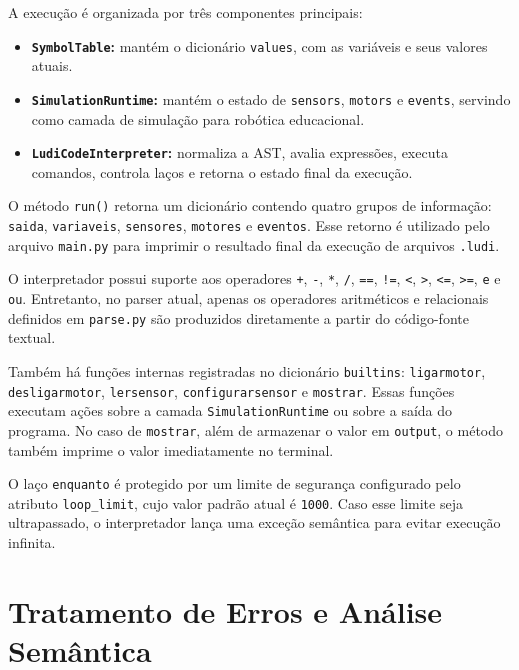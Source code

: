 \documentclass[12pt,a4paper]{article}
\begin{document}
A execução é organizada por três componentes principais:

\begin{itemize}
    \item \textbf{\texttt{SymbolTable}:} mantém o dicionário \texttt{values}, com as variáveis e seus valores atuais.
    \item \textbf{\texttt{SimulationRuntime}:} mantém o estado de \texttt{sensors}, \texttt{motors} e \texttt{events}, servindo como camada de simulação para robótica educacional.
    \item \textbf{\texttt{LudiCodeInterpreter}:} normaliza a AST, avalia expressões, executa comandos, controla laços e retorna o estado final da execução.
\end{itemize}

O método \texttt{run()} retorna um dicionário contendo quatro grupos de informação: \texttt{saida}, \texttt{variaveis}, \texttt{sensores}, \texttt{motores} e \texttt{eventos}. Esse retorno é utilizado pelo arquivo \texttt{main.py} para imprimir o resultado final da execução de arquivos \texttt{.ludi}.

O interpretador possui suporte aos operadores \texttt{+}, \texttt{-}, \texttt{*}, \texttt{/}, \texttt{==}, \texttt{!=}, \texttt{<}, \texttt{>}, \texttt{<=}, \texttt{>=}, \texttt{e} e \texttt{ou}. Entretanto, no parser atual, apenas os operadores aritméticos e relacionais definidos em \texttt{parse.py} são produzidos diretamente a partir do código-fonte textual.

Também há funções internas registradas no dicionário \texttt{builtins}: \texttt{ligarmotor}, \texttt{desligarmotor}, \texttt{lersensor}, \texttt{configurarsensor} e \texttt{mostrar}. Essas funções executam ações sobre a camada \texttt{SimulationRuntime} ou sobre a saída do programa. No caso de \texttt{mostrar}, além de armazenar o valor em \texttt{output}, o método também imprime o valor imediatamente no terminal.

O laço \texttt{enquanto} é protegido por um limite de segurança configurado pelo atributo \texttt{loop\_limit}, cujo valor padrão atual é \texttt{1000}. Caso esse limite seja ultrapassado, o interpretador lança uma exceção semântica para evitar execução infinita.


\section{Tratamento de Erros e Análise Semântica}
\end{document}
